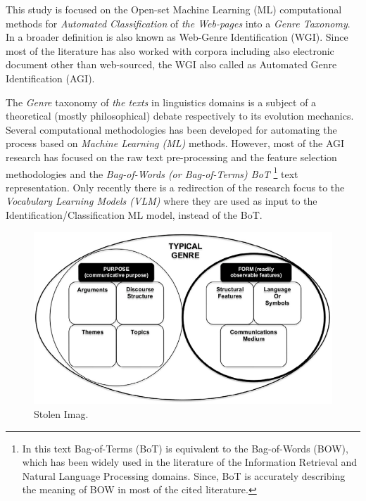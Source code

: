 This study is focused on the Open-set Machine Learning (ML) computational methods for \textit{Automated Classification} of \textit{the Web-pages} into a \textit{Genre Taxonomy}. In a broader definition is also known as Web-Genre Identification (WGI). Since most of the literature has also worked with corpora including also electronic document other than web-sourced, the WGI also called as Automated Genre Identification (AGI).

The \textit{Genre} taxonomy of \textit{the texts} in linguistics domains is a subject of a theoretical (mostly philosophical) debate respectively to its evolution mechanics. Several computational methodologies has been developed for automating the process based on \textit{Machine Learning (ML)} methods. However, most of the AGI research has focused on the raw text pre-processing and the feature selection methodologies and the \textit{Bag-of-Words (or Bag-of-Terms) BoT }\footnote{In this text Bag-of-Terms (BoT) is equivalent to the Bag-of-Words  (BOW), which has been widely used in the literature of the Information Retrieval and Natural Language Processing domains. Since, BoT is accurately describing the meaning of BOW in most of the cited literature.} text representation. Only recently there is a redirection of the research focus to the \textit{Vocabulary Learning Models (VLM)} where they are used as input to the Identification/Classification ML model, instead of the BoT. 






\begin{figure}[t]
	\begin{center}
    	\includegraphics[scale=0.95]{Figures/Sotlen_diagram.eps}
		\caption{Stolen Imag.}
		\label{fiig:Stolen}
	\end{center}
\end{figure}







